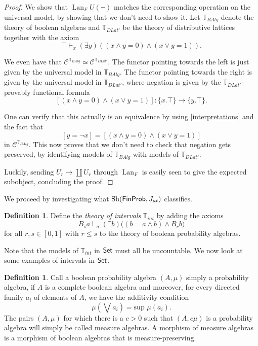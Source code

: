 \documentclass[a4paper]{amsproc}
\theoremstyle{plain}
\theoremstyle{definition}
\newtheorem{definition}[theorem]{Definition}
\theoremstyle{remark}
\numberwithin{equation}{section}
\DeclareMathOperator{\Sh}{Sh}
\DeclareMathOperator{\Lan}{Lan}
\newcommand{\Set}{\textup{\textsf{Set}}}
\newcommand{\FinProb}{\textup{\textsf{FinProb}}}
\newcommand{\C}{\mathcal{C}}
\begin{document}
\begin{proof}
We show that $\Lan_F U(\neg)$ matches the corresponding operation on the universal model, by showing that we don't need to show it. Let $\mathbb{T}_{BAlg}$ denote the theory of boolean algebras and $\mathbb{T}_{DLat'}$ be the theory of distributive lattices together with the axiom
\[
\top \vdash_{x} (\exists y) ((x \wedge y=0)\wedge (x\vee y=1)) .
\]

We even have that $\C^{\mathbb{T}_{BAlg}} \simeq \C^{\mathbb{T}_{DLat'}}$. The functor pointing towards the left is just given by the universal model in $\mathbb{T}_{BAlg}$. The functor pointing towards the right is given by the universal model in $\mathbb{T}_{DLat'}$, where negation is given by the $\mathbb{T}_{DLat'}$-provably functional formula
\[
[(x\wedge y=0) \wedge (x\vee y=1)] : \{x.\top\} \to \{y.\top\}  .
\]

One can verify that this actually is an equivalence by using \ref{interpretations} and the fact that
\[
[y=\neg x] = [(x\wedge y=0) \wedge (x\vee y=1)]
\]
in $\C^{\mathbb{T}_{BAlg}}$. This now proves that we don't need to check that negation gets preserved, by identifying models of $\mathbb{T}_{BAlg}$ with models of $\mathbb{T}_{DLat'}$.

Luckily, sending $U_r \to \coprod U_r$ through $\Lan_F$ is easily seen to give the expected subobject, concluding the proof.
\end{proof}

We proceed by investigating what $\Sh(\FinProb, J_{at})$ classifies.

\begin{definition} \label{theory_of_intevals}
Define the \textit{theory of intervals} $\mathbb{T}_{int}$ by adding the axioms
\[
B_s a \vdash_a (\exists b) \big ( (b = a \wedge b) \wedge B_r b \big )
\]
for all $r,s \in [0,1]$ with $r \leq s$ to the theory of boolean probability algebras.
\end{definition}

Note that the models of $\mathbb{T}_{int}$ in $\Set$ must all be uncountable. We now look at some examples of intervals in $\Set$.

\begin{definition}
Call a boolean probability algebra $(A,\mu)$ simply a probability algebra, if $A$ is a complete boolean algebra and moreover, for every directed family $a_i$ of elements of $A$, we have the additivity condition
\[
\mu(\bigvee a_i) = \text{sup } \mu(a_i) .
\]
The pairs $(A,\mu)$ for which there is a $c > 0$ such that $(A, c \mu)$ is a probability algebra will simply be called measure algebras. A morphism of measure algebras is a morphism of boolean algebras that is measure-preserving.
\end{definition}
\end{document}
